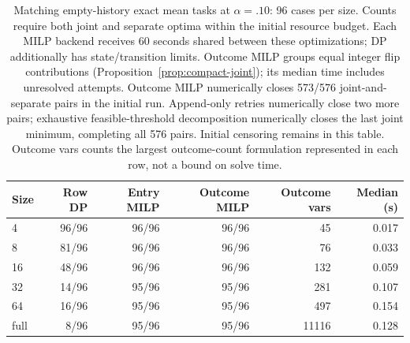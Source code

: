 \begin{table}[t]
\centering\small
\begin{tabular}{lrrrrr}
\toprule
Size & Row DP & Entry MILP & Outcome MILP & Outcome vars & Median (s) \\
\midrule
4 & 96/96 & 96/96 & 96/96 & 45 & 0.017 \\
8 & 81/96 & 96/96 & 96/96 & 76 & 0.033 \\
16 & 48/96 & 96/96 & 96/96 & 132 & 0.059 \\
32 & 14/96 & 95/96 & 95/96 & 281 & 0.107 \\
64 & 16/96 & 95/96 & 95/96 & 497 & 0.154 \\
full & 8/96 & 95/96 & 95/96 & 11116 & 0.128 \\
\bottomrule
\end{tabular}
\caption{Matching empty-history exact mean tasks at $\alpha=.10$: 96 cases per size. Counts require both joint and separate optima within the initial resource budget. Each MILP backend receives 60 seconds shared between these optimizations; DP additionally has state/transition limits. Outcome MILP groups equal integer flip contributions (Proposition~\ref{prop:compact-joint}); its median time includes unresolved attempts. Outcome MILP numerically closes 573/576 joint-and-separate pairs in the initial run. Append-only retries numerically close two more pairs; exhaustive feasible-threshold decomposition numerically closes the last joint minimum, completing all 576 pairs. Initial censoring remains in this table. Outcome vars counts the largest outcome-count formulation represented in each row, not a bound on solve time.}
\label{tab:joint-compact-resources}
\end{table}
